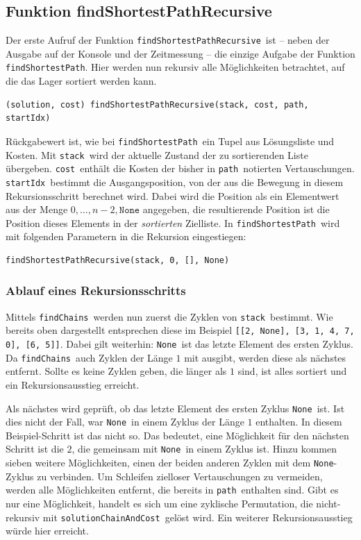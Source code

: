 \documentclass{fh-ium-bama}
\newcommand{\stack}{\lstinline|stack|}
\newcommand{\cost}{\lstinline|cost|}
\newcommand{\path}{\lstinline|path|}
\newcommand{\startIdx}{\lstinline|startIdx|}
\newcommand{\findChains}{\lstinline|findChains|}
\newcommand{\findSPR}{\lstinline|findShortestPathRecursive|}
\newcommand{\findSP}{\lstinline|findShortestPath|}
\newcommand{\None}{\lstinline|None|}
\newcommand{\solcnc}{\lstinline|solutionChainAndCost|}
\begin{document}
\subsection{Funktion findShortestPathRecursive}
Der erste Aufruf der Funktion \findSPR\ ist – neben der Ausgabe auf der Konsole und der Zeitmessung – die einzige Aufgabe der Funktion \findSP.  Hier werden nun rekursiv alle Möglichkeiten betrachtet, auf die das Lager sortiert werden kann.
\begin{lstlisting}
(solution, cost) findShortestPathRecursive(stack, cost, path, startIdx)
\end{lstlisting}
Rückgabewert ist, wie bei \findSP\ ein Tupel aus Lösungsliste und Kosten. Mit \stack\ wird der aktuelle Zustand der zu sortierenden Liste übergeben. \cost\ enthält die Kosten der bisher in \path\ notierten Vertauschungen. \startIdx\ bestimmt die Ausgangsposition, von der aus die Bewegung in diesem Rekursionsschritt berechnet wird. Dabei wird die Position als ein Elementwert aus der Menge ${0,\dots,n-2,\texttt{None}}$ angegeben, die resultierende Position ist die Position dieses Elements in der \textit{sortierten} Zielliste. In \findSP\ wird mit folgenden Parametern in die Rekursion eingestiegen:
\begin{lstlisting}
findShortestPathRecursive(stack, 0, [], None)
\end{lstlisting}

\subsubsection*{Ablauf eines Rekursionsschritts}
Mittels \findChains\ werden nun zuerst die Zyklen von \stack\ bestimmt. Wie bereits oben dargestellt entsprechen diese im Beispiel \lstinline|[[2, None], [3, 1, 4, 7, 0], [6, 5]]|. Dabei gilt weiterhin: \None\ ist das letzte Element des ersten Zyklus.
Da \findChains\ auch Zyklen der Länge $1$ mit ausgibt, werden diese als nächstes entfernt. Sollte es keine Zyklen geben, die länger als $1$ sind, ist alles sortiert und ein Rekursionsausstieg erreicht.

Als nächstes wird geprüft, ob das letzte Element des ersten Zyklus \None\ ist. Ist dies nicht der Fall, war \None\ in einem Zyklus der Länge $1$ enthalten. In diesem Beispiel-Schritt ist das nicht so. Das bedeutet, eine Möglichkeit für den nächsten Schritt ist die $2$, die gemeinsam mit \None\ in einem Zyklus ist. Hinzu kommen sieben weitere Möglichkeiten, einen der beiden anderen Zyklen mit dem \None{}-Zyklus zu verbinden. Um Schleifen zielloser Vertauschungen zu vermeiden, werden alle Möglichkeiten entfernt, die bereits in \path\ enthalten sind. Gibt es nur eine Möglichkeit, handelt es sich um eine zyklische Permutation, die nicht-rekursiv mit \solcnc\ gelöst wird. Ein weiterer Rekursionsausstieg würde hier erreicht.
\end{document}
